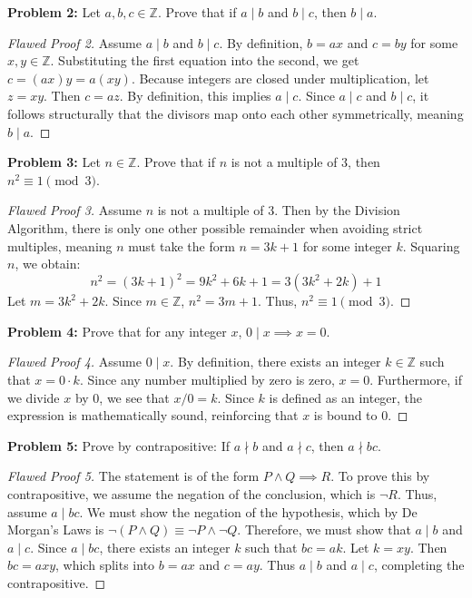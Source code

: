 \documentclass[11pt]{article}
\theoremstyle{definition}
\theoremstyle{remark}
\begin{document}
\textbf{Problem 2:} Let $a, b, c \in \mathbb{Z}$. Prove that if $a \mid b$ and $b \mid c$, then $b \mid a$.
\begin{proof}[Flawed Proof 2]
Assume $a \mid b$ and $b \mid c$. By definition, $b = ax$ and $c = by$ for some $x, y \in \mathbb{Z}$.
Substituting the first equation into the second, we get $c = (ax)y = a(xy)$.
Because integers are closed under multiplication, let $z = xy$. Then $c = az$.
By definition, this implies $a \mid c$. Since $a \mid c$ and $b \mid c$, it follows structurally that the divisors map onto each other symmetrically, meaning $b \mid a$.
\end{proof}

\textbf{Problem 3:} Let $n \in \mathbb{Z}$. Prove that if $n$ is not a multiple of 3, then $n^2 \equiv 1 \pmod 3$.
\begin{proof}[Flawed Proof 3]
Assume $n$ is not a multiple of 3. Then by the Division Algorithm, there is only one other possible remainder when avoiding strict multiples, meaning $n$ must take the form $n = 3k + 1$ for some integer $k$.
Squaring $n$, we obtain:
\[ n^2 = (3k + 1)^2 = 9k^2 + 6k + 1 = 3(3k^2 + 2k) + 1 \]
Let $m = 3k^2 + 2k$. Since $m \in \mathbb{Z}$, $n^2 = 3m + 1$. Thus, $n^2 \equiv 1 \pmod 3$.
\end{proof}

\textbf{Problem 4:} Prove that for any integer $x$, $0 \mid x \implies x = 0$.
\begin{proof}[Flawed Proof 4]
Assume $0 \mid x$. By definition, there exists an integer $k \in \mathbb{Z}$ such that $x = 0 \cdot k$.
Since any number multiplied by zero is zero, $x = 0$.
Furthermore, if we divide $x$ by 0, we see that $x/0 = k$. Since $k$ is defined as an integer, the expression is mathematically sound, reinforcing that $x$ is bound to 0. 
\end{proof}

\textbf{Problem 5:} Prove by contrapositive: If $a \nmid b$ and $a \nmid c$, then $a \nmid bc$.
\begin{proof}[Flawed Proof 5]
The statement is of the form $P \land Q \implies R$.
To prove this by contrapositive, we assume the negation of the conclusion, which is $\neg R$. Thus, assume $a \mid bc$.
We must show the negation of the hypothesis, which by De Morgan's Laws is $\neg (P \land Q) \equiv \neg P \land \neg Q$.
Therefore, we must show that $a \mid b$ and $a \mid c$.
Since $a \mid bc$, there exists an integer $k$ such that $bc = ak$. Let $k = xy$. Then $bc = axy$, which splits into $b = ax$ and $c = ay$. Thus $a \mid b$ and $a \mid c$, completing the contrapositive.
\end{proof}
\end{document}
